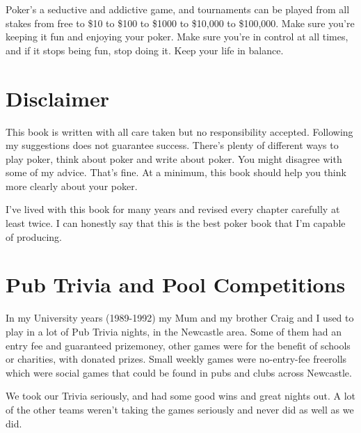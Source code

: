 Poker's a seductive and addictive game,
and tournaments can be played from all stakes from free to \$10 to \$100
to \$1000 to \$10,000 to \$100,000. Make sure you're keeping it fun
and enjoying your poker. Make sure you're in control at all times,
and if it stops being fun, stop doing it. Keep your life in balance.


\section{Disclaimer}

This book is written with all care taken but no responsibility accepted.
Following my suggestions does not guarantee success.
There's plenty of different ways to play poker, think about poker
and write about poker. You might disagree with some of my advice.
That's fine. At a minimum, this book should help you think
more clearly about your poker.

I've lived with this book for many years and revised every chapter
carefully at least twice. I can honestly say that this is the best
poker book that I'm capable of producing.

\section{Pub Trivia and Pool Competitions}

In my University years (1989-1992) my Mum and my brother Craig and I
used to play in a lot of Pub Trivia nights, in the Newcastle
area. Some of them had an entry fee and guaranteed prizemoney, other
games were for the benefit of schools or charities, with donated
prizes. Small weekly games were no-entry-fee freerolls which were
social games that could be found in pubs and clubs across Newcastle.

We took our Trivia seriously, and had some good wins and
great nights out. A lot of the other teams weren't taking the games
seriously and never did as well as we did.

